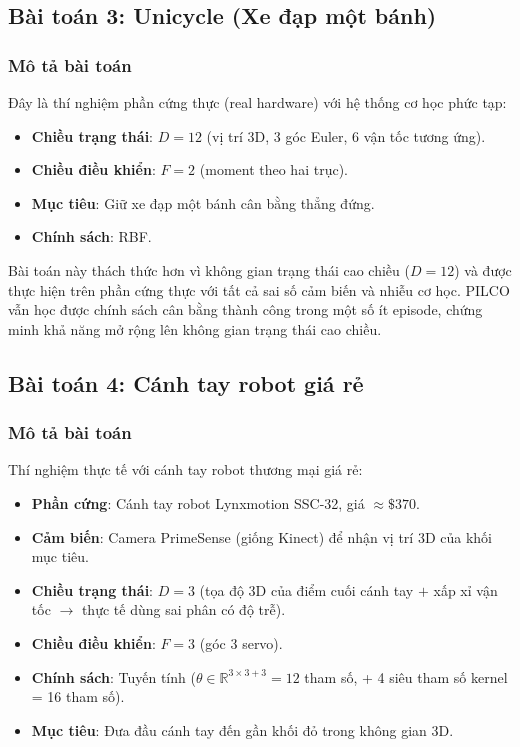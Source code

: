 \subsection{Bài toán 3: Unicycle (Xe đạp một bánh)}
\label{SUB_SEC_unicycle}

\subsubsection{Mô tả bài toán}
\label{SUB_SUB_SEC_uni_description}

Đây là thí nghiệm phần cứng thực (real hardware) với hệ thống cơ học phức tạp:
\begin{itemize}
    \item \textbf{Chiều trạng thái}: $D = 12$ (vị trí 3D, 3 góc Euler, 6 vận tốc tương ứng).
    \item \textbf{Chiều điều khiển}: $F = 2$ (moment theo hai trục).
    \item \textbf{Mục tiêu}: Giữ xe đạp một bánh cân bằng thẳng đứng.
    \item \textbf{Chính sách}: RBF.
\end{itemize}

Bài toán này thách thức hơn vì không gian trạng thái cao chiều ($D = 12$) và được thực hiện trên phần cứng thực với tất cả sai số cảm biến và nhiễu cơ học. PILCO vẫn học được chính sách cân bằng thành công trong một số ít episode, chứng minh khả năng mở rộng lên không gian trạng thái cao chiều.

\subsection{Bài toán 4: Cánh tay robot giá rẻ}
\label{SUB_SEC_robot_arm}

\subsubsection{Mô tả bài toán}
\label{SUB_SUB_SEC_ra_description}

Thí nghiệm thực tế với cánh tay robot thương mại giá rẻ:
\begin{itemize}
    \item \textbf{Phần cứng}: Cánh tay robot Lynxmotion SSC-32, giá $\approx \$370$.
    \item \textbf{Cảm biến}: Camera PrimeSense (giống Kinect) để nhận vị trí 3D của khối mục tiêu.
    \item \textbf{Chiều trạng thái}: $D = 3$ (tọa độ 3D của điểm cuối cánh tay $+$ xấp xỉ vận tốc $\to$ thực tế dùng sai phân có độ trễ).
    \item \textbf{Chiều điều khiển}: $F = 3$ (góc 3 servo).
    \item \textbf{Chính sách}: Tuyến tính ($\theta \in \mathbb{R}^{3 \times 3 + 3} = 12$ tham số, + 4 siêu tham số kernel = 16 tham số).
    \item \textbf{Mục tiêu}: Đưa đầu cánh tay đến gần khối đỏ trong không gian 3D.
\end{itemize}

